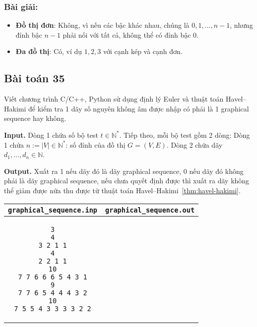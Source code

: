 \documentclass[a4paper,12pt]{article}
\begin{document}
\subsubsection*{Bài giải:}

\begin{itemize}
    \item \textbf{Đồ thị đơn}: Không, vì nếu các bậc khác nhau, chúng là \( 0, 1, \ldots, n-1 \), nhưng đỉnh bậc \( n-1 \) phải nối với tất cả, không thể có đỉnh bậc 0.
    \item \textbf{Đa đồ thị}: Có, ví dụ \( 1, 2, 3 \) với cạnh kép và cạnh đơn.
\end{itemize}

\subsection*{Bài toán 35}
Viết chương trình C/C++, Python sử dụng định lý Euler và thuật toán Havel–Hakimi để kiểm tra 1 dãy số nguyên không âm được nhập có phải là 1 graphical sequence hay không.

\textbf{Input.} Dòng 1 chứa số bộ test $t \in \mathbb{N}^*$. Tiếp theo, mỗi bộ test gồm 2 dòng:  
Dòng 1 chứa $n := |V| \in \mathbb{N}^*$: số đỉnh của đồ thị $G = (V, E)$.  
Dòng 2 chứa dãy $d_1, \ldots, d_n \in \mathbb{N}$.

\textbf{Output.} Xuất ra 1 nếu dãy đó là dãy graphical sequence, 0 nếu dãy đó không phải là dãy graphical sequence, nếu chưa quyết định được thì xuất ra dãy không thể giảm được nữa thu được từ thuật toán Havel–Hakimi~\ref{thm:havel-hakimi}.

\begin{center}
\begin{tabular}{|c|c|}
\hline
\texttt{graphical\_sequence.inp} & \texttt{graphical\_sequence.out} \\
\hline
\begin{minipage}{0.45\textwidth}
\begin{verbatim}
3
4
3 2 1 1
4
2 2 1 1
10
7 7 6 6 6 5 4 3 1
9
7 7 6 5 4 4 4 3 2
10
7 5 5 4 3 3 3 3 2 2
\end{verbatim}
\end{minipage}
&
\begin{minipage}{0.45\textwidth}
\begin{verbatim}

\end{verbatim}
\end{minipage}
\\
\hline
\end{tabular}
\end{center}
\end{document}

